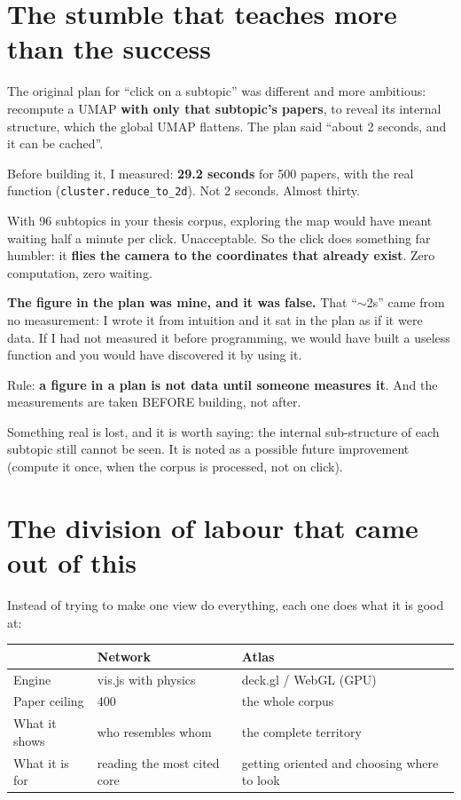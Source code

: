 \documentclass[11pt,a4paper]{article}
\begin{document}
\section{The stumble that teaches more than the success}

The original plan for ``click on a subtopic'' was different and more ambitious: recompute a
UMAP \textbf{with only that subtopic's papers}, to reveal its internal structure, which the
global UMAP flattens. The plan said ``about 2 seconds, and it can be cached''.

Before building it, I measured: \textbf{29.2 seconds} for 500 papers, with the real function
(\texttt{cluster.reduce\_to\_2d}). Not 2 seconds. Almost thirty.

With 96 subtopics in your thesis corpus, exploring the map would have meant waiting half a
minute per click. Unacceptable. So the click does something far humbler: it \textbf{flies the
camera to the coordinates that already exist}. Zero computation, zero waiting.

\begin{ojo}
\textbf{The figure in the plan was mine, and it was false.} That ``$\sim$2s'' came from no measurement: I wrote it from intuition and it sat in the plan as
if it were data. If I had not measured it before programming, we would have built a useless
function and you would have discovered it by using it.

Rule: \textbf{a figure in a plan is not data until someone measures it}. And the measurements
are taken BEFORE building, not after.
\end{ojo}

Something real is lost, and it is worth saying: the internal sub-structure of each subtopic
still cannot be seen. It is noted as a possible future improvement (compute it once, when the
corpus is processed, not on click).

\section{The division of labour that came out of this}

Instead of trying to make one view do everything, each one does what it is good at:

\begin{center}
\begin{tabular}{lll}
\hline
 & \textbf{Network} & \textbf{Atlas} \\
\hline
Engine        & vis.js with physics    & deck.gl / WebGL (GPU) \\
Paper ceiling & 400                    & the whole corpus \\
What it shows & who resembles whom     & the complete territory \\
What it is for & reading the most cited core & getting oriented and choosing where to look \\
\hline
\end{tabular}
\end{center}
\end{document}
